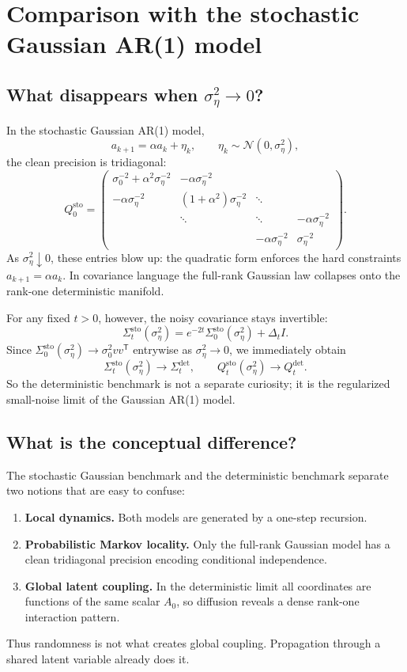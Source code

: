 \documentclass[11pt]{article}
\newcommand{\Id}{I}
\newcommand{\trans}{\mathsf{T}}
\newcommand{\Ncal}{\mathcal{N}}
\begin{document}
\section{Comparison with the stochastic Gaussian AR(1) model}
\subsection{What disappears when $\sigma_\eta^2\to 0$?}
In the stochastic Gaussian AR(1) model,
\[
 a_{k+1}=\alpha a_k+\eta_k,
 \qquad
 \eta_k\sim\Ncal(0,\sigma_\eta^2),
\]
the clean precision is tridiagonal:
\[
Q_0^{\mathrm{sto}}=
\begin{pmatrix}
\sigma_0^{-2}+\alpha^2\sigma_\eta^{-2} & -\alpha\sigma_\eta^{-2} & & \\
-\alpha\sigma_\eta^{-2} & (1+\alpha^2)\sigma_\eta^{-2} & \ddots & \\
& \ddots & \ddots & -\alpha\sigma_\eta^{-2} \\
& & -\alpha\sigma_\eta^{-2} & \sigma_\eta^{-2}
\end{pmatrix}.
\]
As $\sigma_\eta^2\downarrow 0$, these entries blow up: the quadratic form enforces the hard constraints $a_{k+1}=\alpha a_k$. In covariance language the full-rank Gaussian law collapses onto the rank-one deterministic manifold.

For any fixed $t>0$, however, the noisy covariance stays invertible:
\[
\Sigma_t^{\mathrm{sto}}(\sigma_\eta^2)=e^{-2t}\Sigma_0^{\mathrm{sto}}(\sigma_\eta^2)+\Delta_t\Id.
\]
Since $\Sigma_0^{\mathrm{sto}}(\sigma_\eta^2)\to\sigma_0^2 vv^\trans$ entrywise as $\sigma_\eta^2\to 0$, we immediately obtain
\begin{equation}\label{eq:conv_qt}
\Sigma_t^{\mathrm{sto}}(\sigma_\eta^2)\to\Sigma_t^{\mathrm{det}},
\qquad
Q_t^{\mathrm{sto}}(\sigma_\eta^2)\to Q_t^{\mathrm{det}}.
\end{equation}
So the deterministic benchmark is not a separate curiosity; it is the regularized small-noise limit of the Gaussian AR(1) model.

\subsection{What is the conceptual difference?}
The stochastic Gaussian benchmark and the deterministic benchmark separate two notions that are easy to confuse:
\begin{enumerate}[leftmargin=1.5em]
\item \textbf{Local dynamics.} Both models are generated by a one-step recursion.
\item \textbf{Probabilistic Markov locality.} Only the full-rank Gaussian model has a clean tridiagonal precision encoding conditional independence.
\item \textbf{Global latent coupling.} In the deterministic limit all coordinates are functions of the same scalar $A_0$, so diffusion reveals a dense rank-one interaction pattern.
\end{enumerate}
Thus randomness is not what creates global coupling. Propagation through a shared latent variable already does it.
\end{document}
